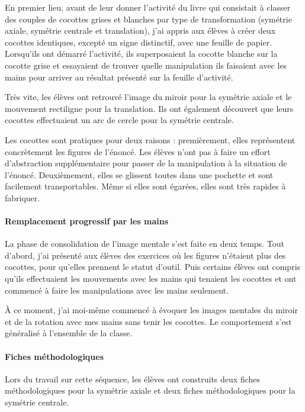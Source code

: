 En premier lieu, avant de leur donner l'activité du livre qui consistait à classer des couples de cocottes grises et blanches par type de transformation (symétrie axiale, symétrie centrale et translation), j'ai appris aux élèves à créer deux cocottes identiques, excepté un signe distinctif, avec une feuille de papier. Lorsqu'ils ont démarré l'activité, ils superposaient la cocotte blanche sur la cocotte grise et essayaient de trouver quelle manipulation ils faisaient avec les mains pour arriver au résultat présenté sur la feuille d'activité.

Très vite, les élèves ont retrouvé l'image du miroir pour la symétrie axiale et le mouvement rectiligne pour la translation. Ils ont également découvert que leurs cocottes effectuaient un arc de cercle pour la symétrie centrale.

Les cocottes sont pratiques pour deux raisons : premièrement, elles représentent concrètement les figures de l'énoncé. Les élèves n'ont pas à faire un effort d'abstraction supplémentaire pour passer de la manipulation à la situation de l'énoncé. Deuxièmement, elles se glissent toutes dans une pochette et sont facilement transportables. Même si elles sont égarées, elles sont très rapides à fabriquer.

\paragraph{Remplacement progressif par les mains}

La phase de consolidation de l'image mentale s'est faite en deux temps. Tout d'abord, j'ai présenté aux élèves des exercices où les figures n'étaient plus des cocottes, pour qu'elles prennent le statut d'outil. Puis certains élèves ont compris qu'ils effectuaient les mouvements avec les mains qui tenaient les cocottes et ont commencé à faire les manipulations avec les mains seulement.

À ce moment, j'ai moi-même commencé à évoquer les images mentales du miroir et de la rotation avec mes mains sans tenir les cocottes. Le comportement s'est généralisé à l'ensemble de la classe.

\paragraph{Fiches méthodologiques}

Lors du travail sur cette séquence, les élèves ont construits deux fiches méthodologiques pour la symétrie axiale et deux fiches méthodologiques pour la symétrie centrale.

